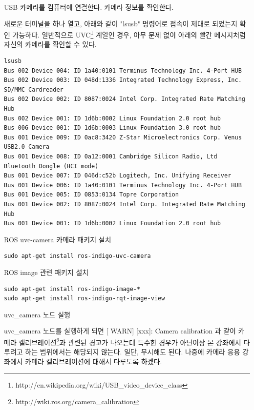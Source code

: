 \setcounter{num}{0}

\vspace{\baselineskip}
\noindent
{}\circled{\thenum} USB 카메라를 컴퓨터에 연결한다.
\circled{\thenum} 카메라 정보를 확인한다.

\noindent
새로운 터미널을 하나 열고, 아래와 같이 "lsusb" 명령어로 접속이 제대로 되었는지 확인 가능하다. 일반적으로 UVC\footnote{http://en.wikipedia.org/wiki/USB\_video\_device\_class} 계열인 경우, 아무 문제 없이 아래의 빨간 메시지처럼 자신의 카메라를 확인할 수 있다. 

\begin{lstlisting}[language=ROS]
lsusb
Bus 002 Device 004: ID 1a40:0101 Terminus Technology Inc. 4-Port HUB
Bus 002 Device 003: ID 048d:1336 Integrated Technology Express, Inc. SD/MMC Cardreader
Bus 002 Device 002: ID 8087:0024 Intel Corp. Integrated Rate Matching Hub
Bus 002 Device 001: ID 1d6b:0002 Linux Foundation 2.0 root hub
Bus 006 Device 001: ID 1d6b:0003 Linux Foundation 3.0 root hub
Bus 001 Device 009: ID 0ac8:3420 Z-Star Microelectronics Corp. Venus USB2.0 Camera
Bus 001 Device 008: ID 0a12:0001 Cambridge Silicon Radio, Ltd Bluetooth Dongle (HCI mode)
Bus 001 Device 007: ID 046d:c52b Logitech, Inc. Unifying Receiver
Bus 001 Device 006: ID 1a40:0101 Terminus Technology Inc. 4-Port HUB
Bus 001 Device 005: ID 0853:0134 Topre Corporation 
Bus 001 Device 002: ID 8087:0024 Intel Corp. Integrated Rate Matching Hub
Bus 001 Device 001: ID 1d6b:0002 Linux Foundation 2.0 root hub
\end{lstlisting}

\circled{\thenum} ROS uvc-camera 카메라 패키지 설치

\begin{lstlisting}[language=ROS]
sudo apt-get install ros-indigo-uvc-camera
\end{lstlisting}

\circled{\thenum} ROS image 관련 패키지 설치

\begin{lstlisting}[language=ROS]
sudo apt-get install ros-indigo-image-*
sudo apt-get install ros-indigo-rqt-image-view 
\end{lstlisting}

\circled{\thenum} uvc\_camera 노드 실행

uvc\_camera 노드를 실행하게 되면 [ WARN] [xxx]: Camera calibration 과 같이 카메라 캘리브레이션\footnote{http://wiki.ros.org/camera\_calibration}과 관련된 경고가 나오는데 특수한 경우가 아닌이상 본 강좌에서 다루려고 하는 범위에서는 해당되지 않는다. 일단, 무시해도 된다. 나중에 카메라 응용 강좌에서 카메라 캘리브레이션에 대해서 다루도록 하겠다.

